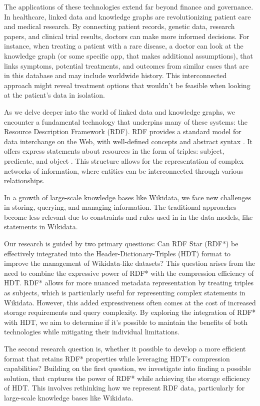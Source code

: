 The applications of these technologies extend far beyond finance and governance. In healthcare, linked data and knowledge graphs are revolutionizing patient care and medical research. By connecting patient records, genetic data, research papers, and clinical trial results, doctors can make more informed decisions. For instance, when treating a patient with a rare disease, a doctor can look at the knowledge graph (or some specific app, that makes additional assumptions), that links symptoms, potential treatments, and outcomes from similar cases that are in this database and may include worldwide history. This interconnected approach might reveal treatment options that wouldn't be feasible when looking at the patient's data in isolation.

As we delve deeper into the world of linked data and knowledge graphs, we encounter a fundamental technology that underpins many of these systems: the Resource Description Framework (RDF). RDF provides a standard model for data interchange on the Web, with well-defined concepts and abstract syntax \citep{cyganiak2014rdf}. It offers express statements about resources in the form of triples: subject, predicate, and object \citep{fernandez2018hdtq}. This structure allows for the representation of complex networks of information, where entities can be interconnected through various relationships.

In a growth of large-scale knowledge bases like Wikidata, we face new challenges in storing, querying, and managing information. The traditional approaches become less relevant due to constraints and rules used in in the data models, like statements in Wikidata.

Our research is guided by two primary questions: Can RDF Star (RDF*) be effectively integrated into the Header-Dictionary-Triples (HDT) format to improve the management of Wikidata-like datasets? This question arises from the need to combine the expressive power of RDF* with the compression efficiency of HDT. RDF* allows for more nuanced metadata representation by treating triples as subjects, which is particularly useful for representing complex statements in Wikidata. However, this added expressiveness often comes at the cost of increased storage requirements and query complexity. By exploring the integration of RDF* with HDT, we aim to determine if it's possible to maintain the benefits of both technologies while mitigating their individual limitations.

The second research question is, whether it possible to develop a more efficient format that retains RDF* properties while leveraging HDT's compression capabilities? Building on the first question, we investigate into finding a possible solution, that captures the power of RDF* while achieving the storage efficiency of HDT. This involves rethinking how we represent RDF data, particularly for large-scale knowledge bases like Wikidata.

